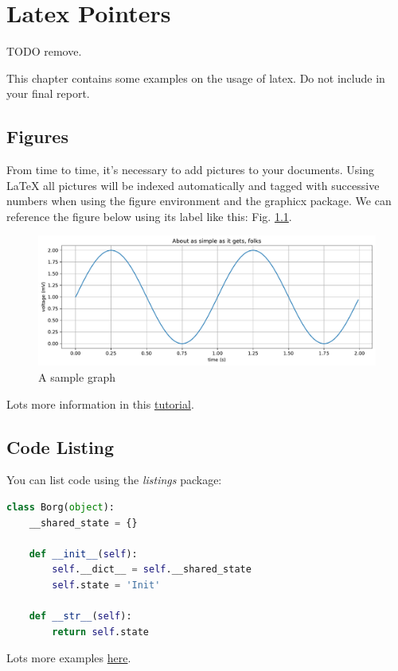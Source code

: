 \chapter{Latex Pointers}

TODO remove.

This chapter contains some examples on the usage of latex. Do not include in your final report.

\section{Figures}
From time to time, it's necessary to add pictures to your documents. Using LaTeX all pictures will be indexed automatically and tagged with successive numbers when using the figure environment and the graphicx package. We can reference the figure below using its label like this: Fig. \ref{fig:test_plot}.
\begin{figure}[h]
  \centering
  \includegraphics[width=0.8\linewidth]{./assets/images/test-plot.pdf}
  \caption{A sample graph}
  \label{fig:test_plot}
\end{figure}

Lots more information in this \href{https://www.latex-tutorial.com/tutorials/figures/}{tutorial}.


\section{Code Listing}
You can list code using the \emph{listings} package:

\begin{lstlisting}[language=Python,caption=Borg Pattern]
class Borg(object):
    __shared_state = {}

    def __init__(self):
        self.__dict__ = self.__shared_state
        self.state = 'Init'

    def __str__(self):
        return self.state
\end{lstlisting}

Lots more examples \href{https://www.overleaf.com/learn/latex/Code_listing}{here}.

